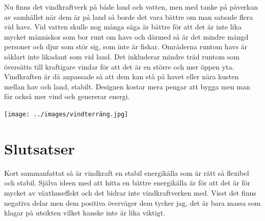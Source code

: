 \documentclass[11p]{article}
\begin{document}
    Nu finns det vindkraftverk på både land och vatten, men med tanke på påverkan av samhället när dem är på land så borde det vara bättre om man satsade flera vid havs.
    Vid vatten skulle nog många säga är bättre för att det är inte lika mycket människor som bor runt om havs och därmed så är det mindre mängd personer och djur som stör sig, som inte är fiskar.
    Områderna runtom havs är såklart inte likadant som vid land.
    Det inkluderar mindre träd runtom som översätts till kraftigare vindar för att det är en större och mer öppen yta.
    Vindkraften är då anpassade så att dem kan stå på havet eller nära kusten mellan hav och land, stabilt.
    Designen kostar mera pengar att bygga men man får också mer vind och genererar energi.


    \texttt{[image: ../images/vindterräng.jpg]}



    \section{Slutsatser}
  Kort sammanfattat så är vindkraft en stabil energikälla som är rätt så flexibel och stabil.
    Själva ideen med att hitta en bättre energikälla är för att det är för mycket av växthuseffekt och det bidrar inte vindkraftverken med.
    Visst det finns negativa delar men dem positiva överväger dem tycker jag, det är bara massa som klagar på utsikten vilket kanske inte är lika viktigt.


\printbibliography
\end{document}
